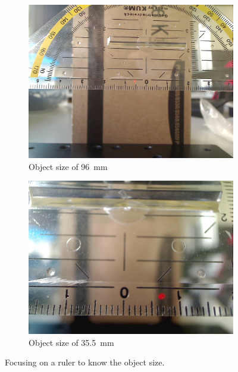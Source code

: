 \documentclass[a4paper, 12pt]{paper}
\begin{document}
\begin{figure}[H]
    \centering
    \begin{subfigure}[b]{0.45\textwidth}
        \includegraphics[width=\textwidth]{img/focale1.jpg}
        \caption{Object size of \SI{96}{\milli\meter}}
    \end{subfigure}
    \begin{subfigure}[b]{0.45\textwidth}
        \includegraphics[width=\textwidth]{img/focale2.jpg}
        \caption{Object size of \SI{35.5}{\milli\meter}}
    \end{subfigure}
    \caption{Focusing on a ruler to know the object size.}
\label{fig:focus_length}
\end{figure}
\end{document}
